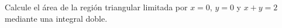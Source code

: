 Calcule el área de la región triangular limitada por $x=0$, $y=0$ y $x+y=2$ mediante una integral doble.
